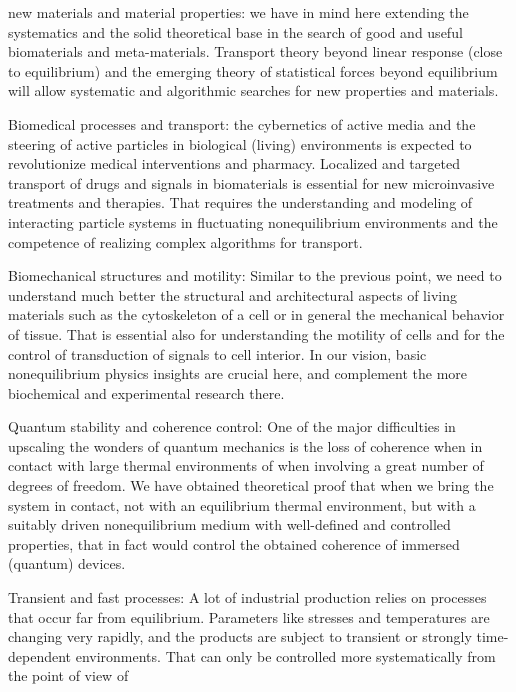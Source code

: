\begin{compactitem}
\item new materials and material properties: we have in mind here extending the systematics
  and the solid theoretical base in the search of good and useful biomaterials and
  meta-materials.  Transport theory beyond linear response (close to equilibrium) and the
  emerging theory of statistical forces beyond equilibrium will allow systematic and
  algorithmic searches for new properties and materials.
\item Biomedical processes and transport: the cybernetics of active media and the steering
  of active particles in biological (living) environments is expected to revolutionize
  medical interventions and pharmacy. Localized and targeted transport of drugs and signals
  in biomaterials is essential for new microinvasive treatments and therapies. That requires
  the understanding and modeling of interacting particle systems in fluctuating
  nonequilibrium environments and the competence of realizing complex algorithms for
  transport.
\item Biomechanical structures and motility: Similar to the previous point, we need to
  understand much better the structural and architectural aspects of living materials such
  as the cytoskeleton of a cell or in general the mechanical behavior of tissue.  That is
  essential also for understanding the motility of cells and for the control of transduction
  of signals to cell interior.  In our vision, basic nonequilibrium physics insights are
  crucial here, and complement the more biochemical and experimental research there.
\item Quantum stability and coherence control: One of the major difficulties in upscaling
  the wonders of quantum mechanics is the loss of coherence when in contact with large
  thermal environments of when involving a great number of degrees of freedom.  We have obtained theoretical proof that
  when we bring the system in contact, not with an equilibrium thermal environment, but with a
  suitably driven nonequilibrium medium with well-defined and controlled properties, that in fact
  would control the obtained coherence of immersed (quantum) devices.
\item Transient and fast processes: A lot of industrial production relies on processes that
  occur far from equilibrium.  Parameters like stresses and temperatures are changing very
  rapidly, and the products are subject to transient or strongly time-dependent
  environments. That can only be controlled more systematically from the point of view of

\end{compactitem}
